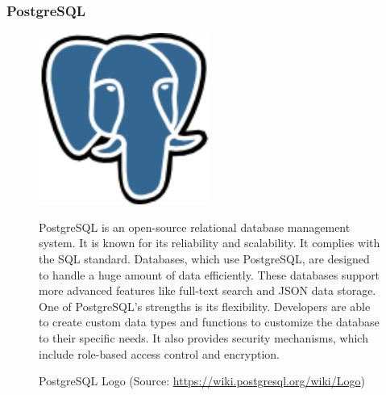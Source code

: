 \subsubsection{PostgreSQL}
\begin{figure}[H]
    \centering
    \begin{minipage}{0.35\textwidth}
        \center
        \includegraphics [width=0.5\textwidth] {images/Technologies/postgresLogo.png}
        \caption{PostgreSQL Logo (Source: \url{https://wiki.postgresql.org/wiki/Logo})}
    \end{minipage}
    \hfill
    \begin{minipage}{0.6\textwidth}
      \setlength{\baselineskip}{1.5em}
      \vspace{-1em}
      PostgreSQL is an open-source relational database management system. It is known for its reliability and scalability. It complies with the SQL standard. Databases, which use PostgreSQL, are designed to handle a huge amount of data efficiently. These databases support more advanced features like full-text search and JSON data storage. One of PostgreSQL's strengths is its flexibility. Developers are able to create custom data types and functions to customize the database to their specific needs. It also provides security mechanisms, which include role-based access control and encryption. 
    \end{minipage}
\end{figure}

\newpage
